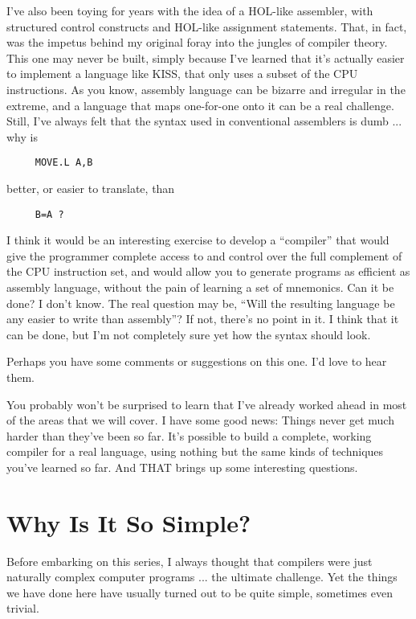 I've also  been  toying  for  years  with  the idea of a HOL-like assembler, with  structured  control  constructs   and  HOL-like assignment statements. That, in  fact, was the impetus behind my original foray into the jungles of compiler theory. This one may never be built, simply  because  I've  learned that it's actually easier to implement a language like KISS, that only uses a subset of the CPU instructions. As you know, assembly language can be bizarre  and  irregular  in the extreme, and a language that maps one-for-one onto it can be a real challenge. Still, I've always felt that the syntax used  in conventional assemblers is dumb ... why is

\begin{verbatim}
     MOVE.L A,B
\end{verbatim}

better, or easier to translate, than

\begin{verbatim}
     B=A ?
\end{verbatim}

I  think  it  would  be  an  interesting  exercise to  develop  a ``compiler'' that  would give the programmer complete access to and control over the full complement  of the CPU instruction set, and would allow you to generate  programs  as  efficient  as assembly language, without the pain  of  learning a set of mnemonics. Can it be done?  I don't  know. The  real question may be, ``Will the resulting language be any  easier  to  write  than assembly''?  If not, there's no point in it. I think that it  can  be  done, but I'm not completely sure yet how the syntax should look.

Perhaps you have some  comments  or suggestions on this one. I'd love to hear them.

You probably won't be surprised to learn that I've already worked ahead in most  of the areas that we will cover. I have some good news:  Things  never  get  much  harder than they've been so far. It's  possible  to  build a complete, working compiler for a real language, using nothing  but  the same kinds of techniques you've learned so far. And THAT brings up some interesting questions.

\section{Why Is It So Simple?}

Before embarking  on this series, I always thought that compilers were just naturally complex computer  programs  ... the ultimate challenge. Yet the things we have done here have  usually turned out to be quite simple, sometimes even trivial.

